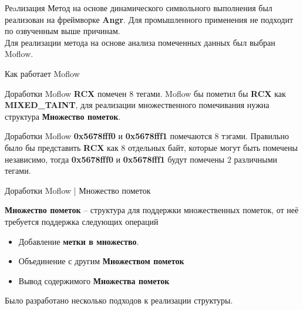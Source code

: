 \documentclass[10pt]{beamer}
\begin{document}
\begin{frame}{Реaлизация}
Метод на основе динамического символьного выполнения был реализован на фреймворке \textbf{Angr}. Для промышленного применения не подходит по озвученным выше причинам.
\\
\pause
Для реализации метода на основе анализа помеченных данных был выбран Moflow.

\end{frame}


\begin{frame}[fragile]{Как работает Moflow}


\end{frame}


\begin{frame}[fragile]{Доработки Moflow}
    \textbf{RCX} помечен $8$ тегами. Moflow бы пометил бы
    \textbf{RCX} как \textbf{MIXED\_TAINT}, для реализации множественного помечивания нужна  структура \textbf{Множество пометок}.


\end{frame}

\begin{frame}[fragile]{Доработки Moflow}
    \textbf{0x5678fff0} и \textbf{0x5678fff1} помечаются $8$ тэгами. Правильно было бы представить \textbf{RCX} как 8 отдельных байт, которые могут быть помечены независимо, тогда \textbf{0x5678fff0} и \textbf{0x5678fff1} будут помечены $2$ различными тегами.

\end{frame}


\begin{frame}{Доработки Moflow | Множество пометок}
    
    \textbf{Множество пометок} -- структура для поддержки множественных пометок, от неё требуется поддержка следующих операций
    \begin{itemize}
        \item Добавление \textbf{метки в множество}.
        \item Объединение с другим \textbf{Множеством пометок}
        \item Вывод содержимого \textbf{Множества пометок}
     \end{itemize}
     \pause
     Было разработано несколько подходов к реализации структуры.

\end{frame}
\end{document}
